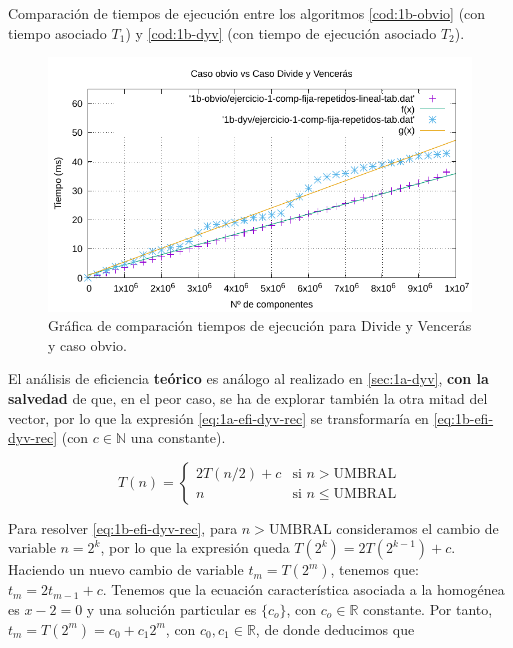 \begin{table}
    \caption{Comparación de tiempos de ejecución entre los algoritmos \ref{cod:1b-obvio} 
    (con tiempo asociado $T_1$) y \ref{cod:1b-dyv} (con tiempo de
    ejecución asociado $T_2$).}
    \label{tab:1b-comp}
\end{table}

\begin{figure}
    \centering
    \includegraphics[scale=0.76]{img/e1b-comp.pdf}
    \caption{Gráfica de comparación tiempos de ejecución para Divide y Vencerás y caso obvio.}
    \label{fig:1b-comp}
\end{figure}


El análisis de eficiencia \textbf{teórico} es análogo al realizado en \ref{sec:1a-dyv}, \textbf{con la salvedad} de que, en el
peor caso, se ha de explorar también la otra mitad del vector, por lo que la expresión \ref{eq:1a-efi-dyv-rec}
se transformaría en \ref{eq:1b-efi-dyv-rec} (con $c \in \mathbb N$ una constante). 

\begin{equation}
    T(n) = \left\{ \begin{array}{lr} 2 T(n/2) + c & \text{si } n > \text{UMBRAL}\\ n & \text{si } n \leqslant \text{UMBRAL} \end{array} \right.
    \label{eq:1b-efi-dyv-rec}
\end{equation}

Para resolver \ref{eq:1b-efi-dyv-rec}, para $n > \text{UMBRAL}$
consideramos el cambio
de variable $n = 2^k$, por lo que la expresión queda $T(2^k) = 2T(2^{k-1}) + c$. Haciendo
un nuevo cambio de variable $t_m = T(2^m)$, tenemos que:
$t_m = 2 t_{m-1} + c$. Tenemos que la ecuación característica
asociada a la homogénea es $x-2 = 0$ y una solución particular 
es $\{c_o\}$, con $c_o \in \mathbb R$ constante. Por tanto, $t_m = T(2^m) = c_0 + c_1 2^m$,
con $c_0, c_1 \in \mathbb R$, de donde deducimos que 

